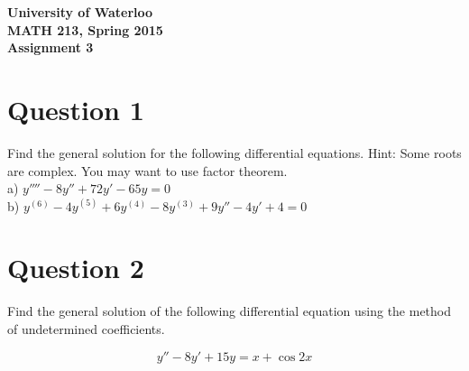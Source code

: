 \documentclass[12pt]{article}
\begin{document}
\begin{center}
{\Large\bf University of Waterloo}\\
\vspace{3mm}
{\Large\bf MATH 213, Spring 2015}\\
\vspace{2mm}
{\Large\bf Assignment 3}\\
\end{center}

\section*{Question 1}

Find the general solution for the following differential equations. Hint: Some roots are complex. You may want to use factor theorem. \\

\noindent
a) $y'''' - 8y'' + 72y' - 65y = 0$ \\
b) $y^{(6)} - 4y^{(5)} + 6y^{(4)} - 8y^{(3)} + 9y'' - 4y' + 4 = 0$

\section*{Question 2}

Find the general solution of the following differential equation using the method of undetermined coefficients.

$$y'' - 8y' + 15y = x + \cos 2x$$
\end{document}
